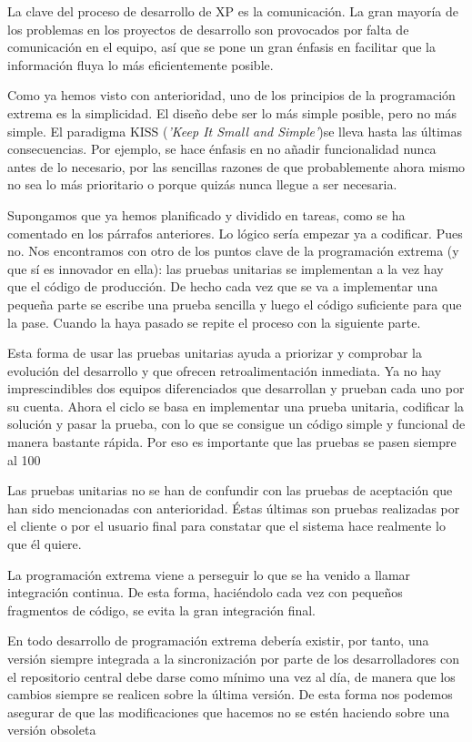 \documentclass[12pt]{book} %
\begin{document}
			La clave del proceso de desarrollo de XP es la comunicación. La gran mayoría de los problemas en los proyectos de desarrollo son
			provocados por falta de comunicación en el equipo, así que se pone un gran énfasis en facilitar que la información fluya lo más
			eficientemente posible. 
			
			Como ya hemos visto con anterioridad, uno de los principios de la programación extrema es la simplicidad. El diseño debe ser lo
			más simple posible, pero no más simple. El paradigma KISS (\textit{'Keep It Small and Simple'})se lleva hasta las últimas 
			consecuencias. Por ejemplo, se hace énfasis en no añadir funcionalidad nunca antes de lo necesario, por las sencillas razones 
			de que probablemente ahora mismo no sea lo más prioritario o porque quizás nunca llegue a ser necesaria.
			
			
			Supongamos que ya hemos planificado y dividido en tareas, como se ha comentado en los párrafos anteriores. Lo lógico sería
			empezar ya a codificar. Pues no. Nos encontramos con otro de los puntos clave de la programación extrema (y que sí es innovador
			en ella): las pruebas unitarias se implementan a la vez hay que el código de producción. De hecho cada vez que se va a
			implementar una pequeña parte se escribe una prueba sencilla y luego el código suficiente para que la pase. Cuando la haya
			pasado se repite el proceso con la siguiente parte.
			
			Esta forma de usar las pruebas unitarias ayuda a priorizar y comprobar la evolución del desarrollo y que ofrecen 
			retroalimentación inmediata. Ya no hay imprescindibles dos equipos diferenciados que desarrollan y prueban cada uno por su
			cuenta. Ahora el ciclo se  basa en implementar una prueba unitaria, codificar la solución y pasar la prueba, con lo que se
			consigue un código simple y funcional de manera bastante rápida. Por eso es importante que las pruebas se pasen siempre al 100%
			
			Las pruebas unitarias no se han de confundir con las pruebas de aceptación que han sido mencionadas con anterioridad. Éstas
			últimas son pruebas realizadas por el cliente o por el usuario final para constatar que el sistema hace realmente lo que él
			quiere.
			 
			La programación extrema viene a perseguir lo que se ha venido a llamar integración continua. De esta forma, haciéndolo cada vez
			con pequeños fragmentos de código, se evita la gran integración final. 
			
			En todo desarrollo de programación extrema debería existir, por tanto, una versión siempre integrada a la sincronización por
			parte de los desarrolladores con el repositorio central debe darse como mínimo una vez al día, de manera que los cambios siempre
			se realicen sobre la última versión. De esta forma nos podemos asegurar de que las modificaciones que hacemos no se estén
			haciendo sobre una  versión obsoleta\\
			
\end{document}
